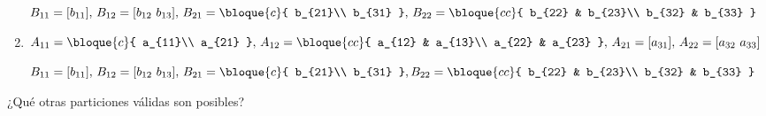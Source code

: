 \begin{enunciado}{\ejercicio}
\begin{enumerate}[label=(\alph*)]
          $B_{11} = [b_{11}],\,
            B_{12} = [b_{12}\ b_{13}],\,
            B_{21} =
            \bloque{c}{
              b_{21}\\
              b_{31}
            },\,
            B_{22} =
            \bloque{cc}{
              b_{22} & b_{23}\\
              b_{32} & b_{33}
            }
          $

    \item
          $A_{11} =
            \bloque{c}{
              a_{11}\\
              a_{21}
            },\,
            A_{12} =
            \bloque{cc}{
              a_{12} & a_{13}\\
              a_{22} & a_{23}
            },\,
            A_{21} = [a_{31}],\,
            A_{22} = [a_{32} \ a_{33}]
          $

          $B_{11} = [b_{11}],\,
            B_{12} = [b_{12}\ b_{13}],\,
            B_{21} =
            \bloque{c}{
              b_{21}\\
              b_{31}
            },
            B_{22} =
            \bloque{cc}{
              b_{22} & b_{23}\\
              b_{32} & b_{33}
            }
          $
  \end{enumerate}
  ¿Qué otras particiones válidas son posibles?
\end{enunciado}

